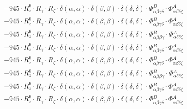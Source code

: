 \documentclass{article}
\begin{document}
\begin{subequations}
\begin{gather}
\begin{array}{c}
 \\[0.2em] 		 - 945 \cdot R_{z}^{6} \cdot R_{\gamma{}} \cdot R_{\zeta{}} \cdot \delta{}\left(\alpha{}, \alpha{}\right) \cdot \delta{}\left(\beta{}, \beta{}\right) \cdot \delta{}\left(\delta{}, \delta{}\right) \cdot \Phi{}^{B}_{\alpha{}\beta{}\gamma{}\delta{}} \cdot \Phi{}^{A}_{\alpha{}\beta{}\delta{}\zeta{}} 
 \\[0.2em] 		 - 945 \cdot R_{z}^{6} \cdot R_{\gamma{}} \cdot R_{\zeta{}} \cdot \delta{}\left(\alpha{}, \alpha{}\right) \cdot \delta{}\left(\beta{}, \beta{}\right) \cdot \delta{}\left(\delta{}, \delta{}\right) \cdot \Phi{}^{B}_{\alpha{}\beta{}\gamma{}\delta{}} \cdot \Phi{}^{A}_{\alpha{}\beta{}\delta{}\zeta{}} 
 \\[0.2em] 		 - 945 \cdot R_{z}^{6} \cdot R_{\gamma{}} \cdot R_{\zeta{}} \cdot \delta{}\left(\alpha{}, \alpha{}\right) \cdot \delta{}\left(\beta{}, \beta{}\right) \cdot \delta{}\left(\delta{}, \delta{}\right) \cdot \Phi{}^{B}_{\alpha{}\beta{}\beta{}\gamma{}} \cdot \Phi{}^{A}_{\alpha{}\delta{}\delta{}\zeta{}} 
 \\[0.2em] 		 - 945 \cdot R_{z}^{6} \cdot R_{\gamma{}} \cdot R_{\zeta{}} \cdot \delta{}\left(\alpha{}, \alpha{}\right) \cdot \delta{}\left(\beta{}, \beta{}\right) \cdot \delta{}\left(\delta{}, \delta{}\right) \cdot \Phi{}^{B}_{\alpha{}\beta{}\gamma{}\delta{}} \cdot \Phi{}^{A}_{\alpha{}\beta{}\delta{}\zeta{}} 
 \\[0.2em] 		 - 945 \cdot R_{z}^{6} \cdot R_{\gamma{}} \cdot R_{\zeta{}} \cdot \delta{}\left(\alpha{}, \alpha{}\right) \cdot \delta{}\left(\beta{}, \beta{}\right) \cdot \delta{}\left(\delta{}, \delta{}\right) \cdot \Phi{}^{B}_{\alpha{}\beta{}\gamma{}\delta{}} \cdot \Phi{}^{A}_{\alpha{}\beta{}\delta{}\zeta{}} 
 \\[0.2em] 		 - 945 \cdot R_{z}^{6} \cdot R_{\gamma{}} \cdot R_{\zeta{}} \cdot \delta{}\left(\alpha{}, \alpha{}\right) \cdot \delta{}\left(\beta{}, \beta{}\right) \cdot \delta{}\left(\delta{}, \delta{}\right) \cdot \Phi{}^{B}_{\alpha{}\beta{}\beta{}\gamma{}} \cdot \Phi{}^{A}_{\alpha{}\delta{}\delta{}\zeta{}} 
 \\[0.2em] 		 - 945 \cdot R_{z}^{6} \cdot R_{\gamma{}} \cdot R_{\zeta{}} \cdot \delta{}\left(\alpha{}, \alpha{}\right) \cdot \delta{}\left(\beta{}, \beta{}\right) \cdot \delta{}\left(\delta{}, \delta{}\right) \cdot \Phi{}^{B}_{\alpha{}\beta{}\gamma{}\delta{}} \cdot \Phi{}^{A}_{\alpha{}\beta{}\delta{}\zeta{}} 
 \\[0.2em] 		 - 945 \cdot R_{z}^{6} \cdot R_{\gamma{}} \cdot R_{\zeta{}} \cdot \delta{}\left(\alpha{}, \alpha{}\right) \cdot \delta{}\left(\beta{}, \beta{}\right) \cdot \delta{}\left(\delta{}, \delta{}\right) \cdot \Phi{}^{B}_{\alpha{}\beta{}\gamma{}\delta{}} \cdot \Phi{}^{A}_{\alpha{}\beta{}\delta{}\zeta{}} 

\end{array}
\end{gather}
\end{subequations}
\end{document}
